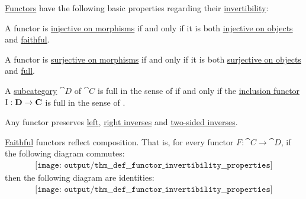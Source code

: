 \begin{proposition}\label{thm:def:functor_invertibility}
  \hyperref[def:functor]{Functors} have the following basic properties regarding their \hyperref[def:functor_invertibility]{invertibility}:

  \begin{thmenum}
     A functor is \hyperref[def:functor_invertibility/injective_on_morphisms]{injective on morphisms} if and only if it is both \hyperref[def:functor_invertibility/injective_on_objects]{injective on objects} and \hyperref[def:functor_invertibility/faithful]{faithful}.

     A functor is \hyperref[def:functor_invertibility/surjective_on_morphisms]{surjective on morphisms} if and only if it is both \hyperref[def:functor_invertibility/surjective_on_objects]{surjective on objects} and \hyperref[def:functor_invertibility/full]{full}.

     A \hyperref[def:subcategory]{subcategory} \( \cat{D} \) of \( \cat{C} \) is full in the sense of  if and only if the \hyperref[def:subcategory]{inclusion functor} \( \operatorname{I}: \operatorname{\mathbf{D}} \to \operatorname{\mathbf{C}} \) is full in the sense of .

     Any functor preserves \hyperref[def:morphism_invertibility/left_invertible]{left}, \hyperref[def:morphism_invertibility/right_invertible]{right inverses} and \hyperref[def:morphism_invertibility/isomorphism]{two-sided inverses}.

     \hyperref[def:functor_invertibility/faithful]{Faithful} functors reflect composition. That is, for every functor \( F: \cat{C} \to \cat{D} \), if the following diagram commutes:
    \begin{equation}\label{eq:thm:def:functor_invertibility/faithful_reflects_composition/image}
      \begin{aligned}
        \texttt{[image: output/thm\_\_def\_\_functor\_invertibility\_\_properties]}
      \end{aligned}
    \end{equation}
    then the following diagram are identities:
    \begin{equation}\label{eq:thm:def:functor_invertibility/faithful_reflects_composition/source}
      \begin{aligned}
        \texttt{[image: output/thm\_\_def\_\_functor\_invertibility\_\_properties]}
      \end{aligned}
    \end{equation}


\end{thmenum}
\end{proposition}
